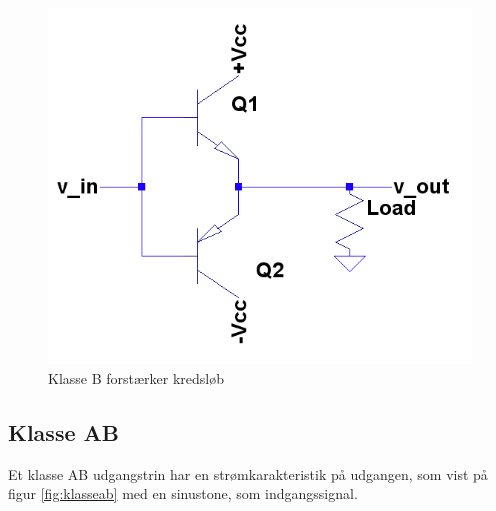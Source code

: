 \begin{figure}[h]
\centering
\includegraphics[scale=.35]{valg_af_loesning/klasser/classb.png}
\caption{Klasse B forstærker kredsløb}
\label{fig:classb}
\end{figure}

\subsection{Klasse AB}

Et klasse AB udgangstrin har en strømkarakteristik på udgangen, som vist på figur \ref{fig:klasseab} med en sinustone, som indgangssignal. 


